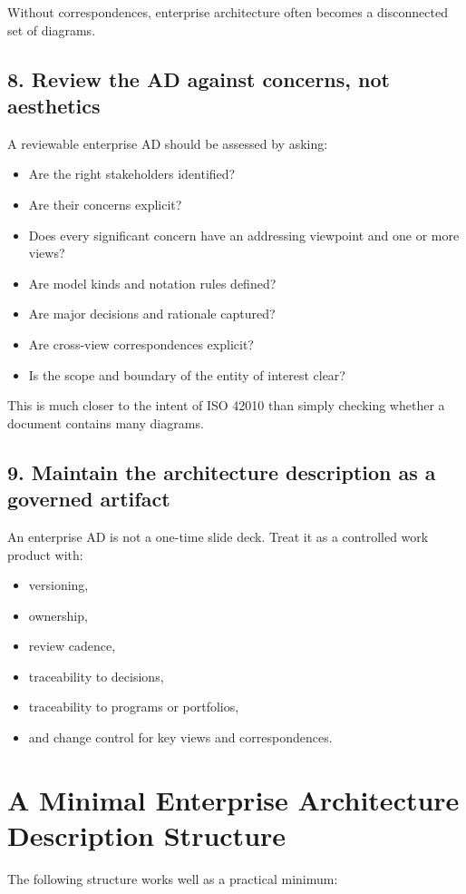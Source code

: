 \documentclass[11pt]{article}
\begin{document}
Without correspondences, enterprise architecture often becomes a disconnected set of diagrams.

\subsection*{8. Review the AD against concerns, not aesthetics}
A reviewable enterprise AD should be assessed by asking:
\begin{itemize}
    \item Are the right stakeholders identified?
    \item Are their concerns explicit?
    \item Does every significant concern have an addressing viewpoint and one or more views?
    \item Are model kinds and notation rules defined?
    \item Are major decisions and rationale captured?
    \item Are cross-view correspondences explicit?
    \item Is the scope and boundary of the entity of interest clear?
\end{itemize}

This is much closer to the intent of ISO 42010 than simply checking whether a document contains many diagrams.

\subsection*{9. Maintain the architecture description as a governed artifact}
An enterprise AD is not a one-time slide deck. Treat it as a controlled work product with:
\begin{itemize}
    \item versioning,
    \item ownership,
    \item review cadence,
    \item traceability to decisions,
    \item traceability to programs or portfolios,
    \item and change control for key views and correspondences.
\end{itemize}

\section*{A Minimal Enterprise Architecture Description Structure}
The following structure works well as a practical minimum:
\end{document}
